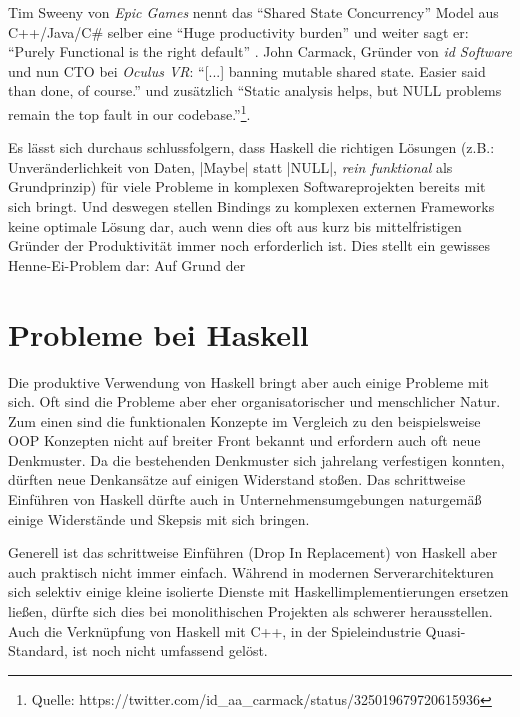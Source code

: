 
Tim Sweeny von \textit{Epic Games} nennt das "`Shared State Concurrency"' Model aus C++/Java/C\# selber eine "`Huge productivity burden"' und weiter sagt er: "`Purely Functional is the right default"' \parencite[Vgl.][Seite 42 u. Seite 56]{Sweeney2006}. John Carmack, Gründer von \textit{id Software} und nun CTO bei \textit{Oculus VR}: "`[...] banning mutable shared state. Easier said than done, of course."' und zusätzlich "`Static analysis helps, but NULL problems remain the top fault in our codebase."'\footnote{Quelle: https://twitter.com/id\_aa\_carmack/status/325019679720615936}.

Es lässt sich durchaus schlussfolgern, dass Haskell die richtigen Lösungen (z.B.: Unveränderlichkeit von Daten, |Maybe| statt |NULL|, \textit{rein funktional} als Grundprinzip) für viele Probleme in komplexen Softwareprojekten bereits mit sich bringt. Und deswegen stellen Bindings zu komplexen externen Frameworks keine optimale Lösung dar, auch wenn dies oft aus kurz bis mittelfristigen Gründer der Produktivität immer noch erforderlich ist. Dies stellt ein gewisses Henne-Ei-Problem dar: Auf Grund der 

\section{Probleme bei Haskell}\label{sec:probleme-haskell}

Die produktive Verwendung von Haskell bringt aber auch einige Probleme mit sich. Oft sind die Probleme aber eher organisatorischer und menschlicher Natur. Zum einen sind die funktionalen Konzepte im Vergleich zu den beispielsweise OOP Konzepten nicht auf breiter Front bekannt und erfordern auch oft neue Denkmuster. Da die bestehenden Denkmuster sich jahrelang verfestigen konnten, dürften neue Denkansätze auf einigen Widerstand stoßen. Das schrittweise Einführen von Haskell dürfte auch in Unternehmensumgebungen naturgemäß einige Widerstände und Skepsis mit sich bringen.

Generell ist das schrittweise Einführen (Drop In Replacement) von Haskell aber auch praktisch nicht immer einfach. Während in modernen Serverarchitekturen sich selektiv einige kleine isolierte Dienste mit Haskellimplementierungen ersetzen ließen, dürfte sich dies bei monolithischen Projekten als schwerer herausstellen. Auch die Verknüpfung von Haskell mit C++, in der Spieleindustrie Quasi-Standard, ist noch nicht umfassend gelöst.


\begingroup
\setlength\intextsep{0pt}
